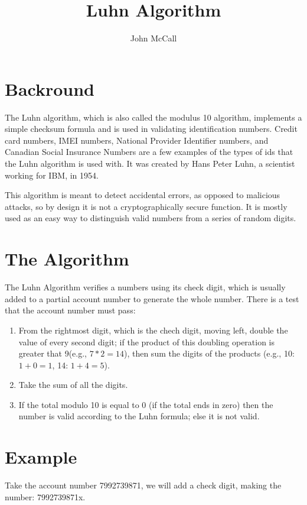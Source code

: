 \documentclass{article}
\title{Luhn Algorithm}
\author{John McCall}
\begin{document}
\maketitle

\section{Backround}
The Luhn algorithm, which is also called the modulus 10 algorithm, implements a simple
checksum formula and is used in validating identification numbers. Credit card numbers, IMEI
numbers, National Provider Identifier numbers, and Canadian Social Insurance Numbers are a
few examples of the types of ids that the Luhn algorithm is used with. It was created by
Hans Peter Luhn, a scientist working for IBM, in 1954.

This algorithm is meant to detect accidental errors, as opposed to malicious attacks, so by
design it is not a cryptographically secure function. It is mostly used as an easy way to
distinguish valid numbers from a series of random digits.

\section{The Algorithm}
The Luhn Algorithm verifies a numbers using its check digit, which is usually
added to a partial account number to generate the whole number. There is a
test that the account number must pass:

\begin{enumerate}

\item From the rightmost digit, which is the chech digit, moving left, double
the value of every second digit; if the product of this doubling operation is
greater that 9(e.g., $7*2=14$), then sum the digits of the products (e.g., 10: 
$1+0=1$, 14: $1+4=5$).

\item Take the sum of all the digits.

\item If the total modulo 10 is equal to 0 (if the total ends in zero) then the
number is valid according to the Luhn formula; else it is not valid.

\end{enumerate}

\section{Example}
Take the account number 7992739871, we will add a check digit, making the
number: 7992739871x.
\end{document}
